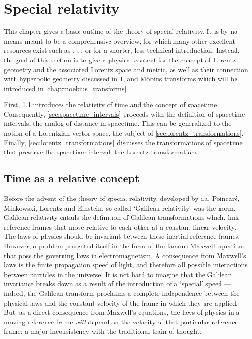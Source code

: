 \chapter{Special relativity}
\label{chap:relativity}
This chapter gives a basic outline of the theory of special relativity. It is by no means meant to be a comprehensive overview, for which many other excellent resources exist such as \citet{Misner1970}, \citet{Taylor1992}, \citet{Landau1971}, or \citet{Penrose1978} for a shorter, less technical introduction. Instead, the goal of this section is to give a physical context for the concept of Lorentz geometry and the associated Lorentz space and metric, as well as their connection with hyperbolic geometry discussed in \cref{chap:relativity}, and Möbius transforms which will be introduced in \cref{chap:moebius_transforms}.

First, \cref{sec:time_relative} introduces the relativity of time and the concept of spacetime. Consequently, \cref{sec:spacetime_intervals} proceeds with the definition of spacetime intervals, the analog of distance in spacetime. This can be generalized to the notion of a Lorentzian vector space, the subject of \cref{sec:lorentz_transformations}. Finally, \cref{sec:lorentz_transformations} discusses the transformations of spacetime that preserve the spacetime interval: the Lorentz transformations.

\section{Time as a relative concept}
\label{sec:time_relative}
Before the advent of the theory of special relativity, developed by i.a. Poincaré, Minkowski, Lorentz and Einstein, so-called `Galilean relativity' was the norm. Galilean relativity entails the definition of Galilean transformations which, link reference frames that move relative to each other at a constant linear velocity. The laws of physics should be invariant between these inertial reference frames. However, a problem presented itself in the form of the famous Maxwell equations that pose the governing laws in electromagnetism. A consequence from Maxwell's laws is the finite propagation speed of light, and therefore all possible interactions between particles in the universe. It is not hard to imagine that the Galilean invariance breaks down as a result of the introduction of a `special' speed --- indeed, the Galilean transform proclaims a complete independence between the physical laws and the constant velocity of the frame in which they are applied. But, as a direct consequence from Maxwell's equations, the laws of physics in a moving reference frame \emph{will} depend on the velocity of that particular reference frame: a major inconsistency with the traditional train of thought.

